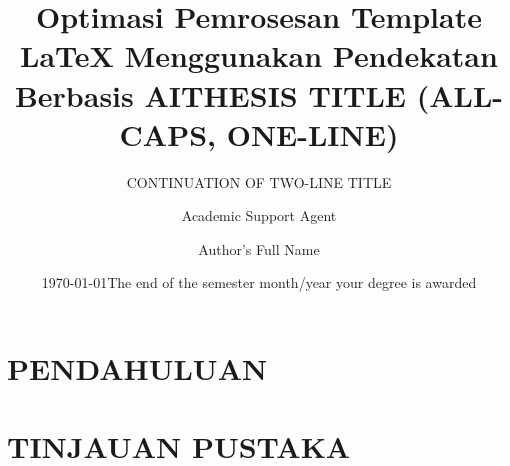 \documentclass{csuebthesis}
\title{Optimasi Pemrosesan Template LaTeX Menggunakan Pendekatan Berbasis AI}
\author{Academic Support Agent}
\date{\today}
\begin{document}
\maketitle

\begin{abstract}

\end{abstract}

\chapter{PENDAHULUAN}


\chapter{TINJAUAN PUSTAKA}


\usepackage{amsmath}
\usepackage[colorlinks=true]{hyperref} %
\usepackage{lipsum} %

\usepackage{graphicx}

\usepackage[style=chem-acs,articletitle=true,doi=true]{biblatex} %

\usepackage{fontspec}
\setmainfont{Times New Roman}

\title{THESIS TITLE (ALL-CAPS, ONE-LINE)}
\subtitle{CONTINUATION OF TWO-LINE TITLE}
\author{Author's Full Name}
\date{The end of the semester month/year your degree is awarded}
\end{document}
